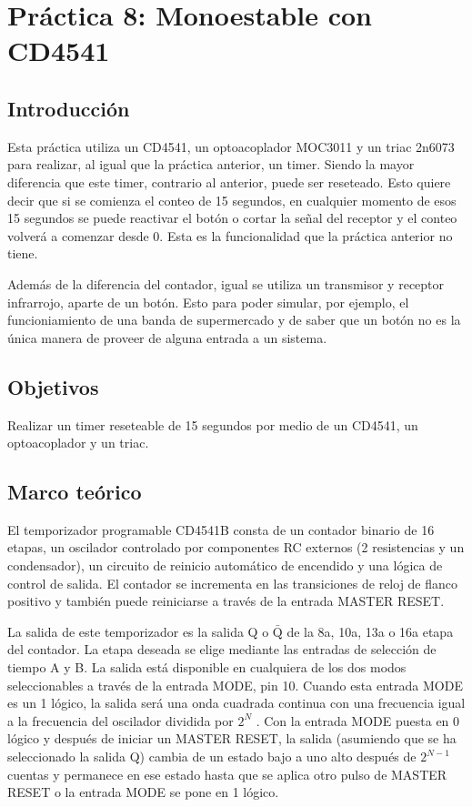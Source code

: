 \clearpage

\section{Práctica 8: Monoestable con CD4541}

\subsection{Introducción}

Esta práctica utiliza un CD4541, un optoacoplador MOC3011 y un triac 2n6073 para realizar, al igual que la práctica anterior, un timer. Siendo la mayor diferencia que este timer, contrario al anterior, puede ser reseteado. Esto quiere decir que si se comienza el conteo de 15 segundos, en cualquier momento de esos 15 segundos se puede reactivar el botón o cortar la señal del receptor y el conteo volverá a comenzar desde 0. Esta es la funcionalidad que la práctica anterior no tiene.

Además de la diferencia del contador, igual se utiliza un transmisor y receptor infrarrojo, aparte de un botón. Esto para poder simular, por ejemplo, el funcioniamiento de una banda de supermercado y de saber que un botón no es la única manera de proveer de alguna entrada a un sistema.

\subsection{Objetivos}

Realizar un timer reseteable de 15 segundos por medio de un CD4541, un optoacoplador y un triac.

\subsection{Marco teórico}

El temporizador programable CD4541B consta de un contador binario de 16 etapas, un oscilador controlado por componentes RC externos (2 resistencias y un condensador), un circuito de reinicio automático de encendido y una lógica de control de salida. El contador se incrementa en las transiciones de reloj de flanco positivo y también puede reiniciarse a través de la entrada MASTER RESET.

La salida de este temporizador es la salida Q o $\bar{\mathrm{Q}}$ de la 8a, 10a, 13a o 16a etapa del contador. La etapa deseada se elige mediante las entradas de selección de tiempo A y B. La salida está disponible en cualquiera de los dos modos seleccionables a través de la entrada MODE, pin 10. Cuando esta entrada MODE es un 1 lógico, la salida será una onda cuadrada continua con una frecuencia igual a la frecuencia del oscilador dividida por $2^N$ . Con la entrada MODE puesta en 0 lógico y después de iniciar un MASTER RESET, la salida (asumiendo que se ha seleccionado la salida Q) cambia de un estado bajo a uno alto después de $2^{N-1}$ cuentas y permanece en ese estado hasta que se aplica otro pulso de MASTER RESET o la entrada MODE se pone en 1 lógico.

